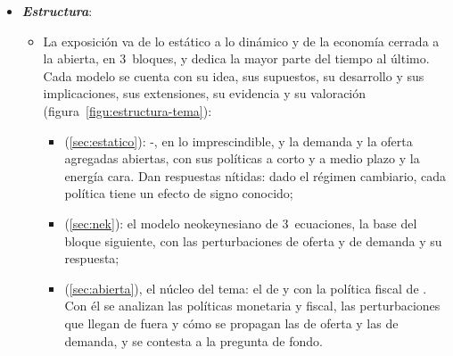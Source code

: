 \documentclass[11pt]{article}
\begin{document}
\begin{itemize}
\item \textbf{\emph{Estructura}}:
  \begin{itemize}
  \item La exposición va de lo estático a lo dinámico y de la economía cerrada a la abierta, en 3~bloques, y dedica la mayor parte del tiempo al último. Cada modelo se cuenta con su idea, sus supuestos, su desarrollo y sus implicaciones, sus extensiones, su evidencia y su valoración (figura~\ref{figu:estructura-tema}):
    \begin{itemize}
    \item {} (\ref{sec:estatico}): -, en lo imprescindible, y la demanda y la oferta agregadas abiertas, con sus políticas a corto y a medio plazo y la energía cara. Dan respuestas nítidas: dado el régimen cambiario, cada política tiene un efecto de signo conocido;
    \item {} (\ref{sec:nek}): el modelo neokeynesiano de 3~ecuaciones, la base del bloque siguiente, con las perturbaciones de oferta y de demanda y su respuesta;
    \item {} (\ref{sec:abierta}), el núcleo del tema: el de  y  con la política fiscal de . Con él se analizan las políticas monetaria y fiscal, las perturbaciones que llegan de fuera y cómo se propagan las de oferta y las de demanda, y se contesta a la pregunta de fondo.
    \end{itemize}
  \end{itemize}
\end{itemize}
\end{document}
